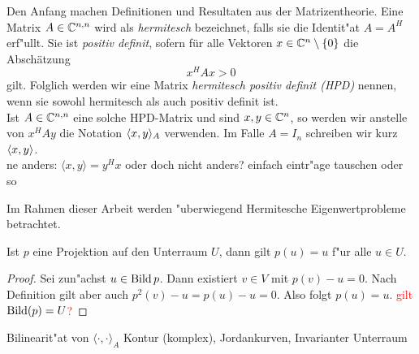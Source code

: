 Den Anfang machen Definitionen und Resultaten aus der Matrizentheorie.
Eine Matrix $A\in\Cnn$ wird als \emph{hermitesch} bezeichnet, falls
sie die Identit"at $A=A^H$ erf"ullt. Sie ist \emph{positiv definit}, sofern
für alle Vektoren $x\in\Co$ die Abschätzung
\[
x^H A x > 0
\]
gilt. Folglich werden wir eine Matrix \emph{hermitesch positiv definit (HPD)}
nennen, wenn sie sowohl hermitesch als auch positiv definit ist.\\

Ist $A\in\Cnn$ eine solche HPD-Matrix und sind $x,y\in\Cn$, so werden wir anstelle von
$x^H A y$ die Notation $\sp{A}{x,y}$ verwenden. Im Falle $A=I_n$ schreiben wir
kurz $\sp{}{x,y}$.\\

ne anders: $\langle x,y \rangle = y^H x$ oder doch nicht anders? einfach eintr"age tauschen oder so

Im Rahmen dieser Arbeit werden "uberwiegend Hermitesche Eigenwertprobleme betrachtet.

\begin{prop}
Ist $p$ eine Projektion auf den Unterraum $U$, dann gilt $p(u) = u$ f"ur
alle $u \in U$.
\end{prop}
\begin{proof}
Sei zun"achst $u \in \Bild{p}$. Dann existiert $v \in V$ mit $p(v) - u = 0$.
Nach Definition gilt aber auch $p^2(v)-u = p(u)-u = 0$. Also folgt $p(u)=u$.
\textcolor{red}{gilt $\Bild(p) = U$?}
\end{proof}

Bilinearit"at von $\langle \cdot, \cdot \rangle_A$
Kontur (komplex), Jordankurven, Invarianter Unterraum
